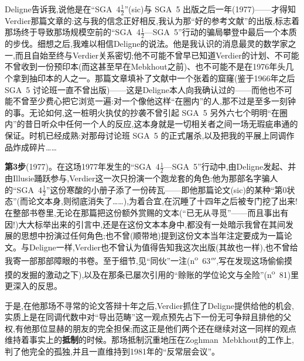 Deligne告诉我,说他是在“SGA~4$\frac{1}{2}$”(sic)与 SGA~5 出版之后一年(1977)——才得知Verdier那篇文章的:这与我的信念正好相反,我认为那“好的参考文献”的出版,标志着那场终于导致那场规模空前的“SGA~4$\frac{1}{2}$—SGA~5”行动的骗局攀登中最后一个本质的步伐。细想之后,我难以相信Deligne的说法。他是我认识的消息最灵的数学家之一,而且自始至终与Verdier关系密切;他不可能不曾早已知道Verdier的计划、不可能不曾收到一份预印本(而这甚至早在Mebkhout之前)、也不可能不是在1976年头几个拿到抽印本的人之一。那篇文章填补了文献中一个张着的窟窿(鉴于1966年之后 SGA~5 讨论班一直不曾出版)——这是Deligne本人向我确认过的——而他也不可能不曾至少费心把它浏览一遍:对一个像他这样“在圈内”的人,那不过是至多一刻钟的事。无论如何,这一桩明火执仗的抄袭不曾引起 SGA~5 另外六七个明明“在圈内”的昔日听众中任何一个人的反应,这本身就是一切相关者之间一场无瑕疵串通的保证。时机已经成熟:对那母讨论班 SGA~5 的正式屠杀,以及把我的平展上同调作品炸成碎片……

\textbf{第3步}(1977)。在这场1977年发生的“SGA~4$\frac{1}{2}$—SGA~5”行动中,由Deligne发起、并由Illusie踊跃参与,Verdier这一次只扮演一个跑龙套的角色:他为那部名字骗人的“SGA~4$\frac{1}{2}$”这份寒酸的小册子添了一份砖瓦——即他那篇论文(sic)的某种“第0状态”(而论文本身,则彻底消失了……),为着合宜,在沉睡了十四年之后被专门挖了出来!在整部书卷里,无论在那篇把这份额外赏赐的文本(“已无从寻觅”——而且事出有因!)大大标举出来的引言中,还是在这份文本本身中,都没有一处暗示我曾在其间发展的思想中扮演过任何角色;也不曾(顺带地)提到这份文本当年注定要成为一篇论文。与Deligne一样,Verdier也不曾认为值得告知我这次出版(其故也一样),也不曾给我寄一部那部障眼的书卷。至于细节,见“同伙”一注(n\textsuperscript{o}~63$'''$,写在发现这场偷偷摸摸的发掘的激动之下),以及在那条已屡次引用的“赊账的学位论文与全险”(n\textsuperscript{o}~81)里更深入的反思。

于是,在他那场不寻常的论文答辩十年之后,Verdier抓住了Deligne提供给他的机会,实质上是在同调代数中对“导出范畴”这一观点预先占下一份无可争辩且排他的父权,有他那位显赫的朋友的完全担保;而这正是他们两个还在继续对这一同样的观点维持着事实上的\textbf{抵制}的时候。那场抵制沉重地压在Zoghman~Mebkhout的工作上,判了他完全的孤独,并且一直维持到1981年的“反常层会议”。

